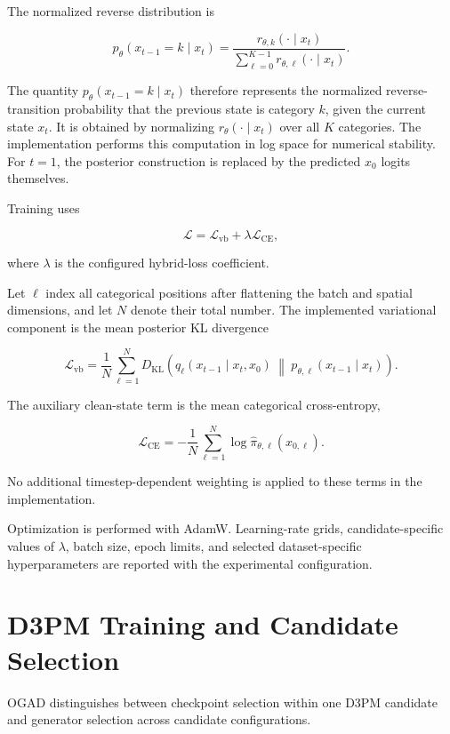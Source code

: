 The normalized reverse distribution is

\[
p_\theta
\left(
x_{t-1}=k
\mid
x_t
\right)
=
\frac{
r_{\theta,k}(\cdot\mid x_t)
}{
\sum_{\ell=0}^{K-1}
r_{\theta,\ell}(\cdot\mid x_t)
}.
\]

The quantity \(p_\theta(x_{t-1}=k\mid x_t)\) therefore represents the normalized reverse-transition probability that the previous state is category \(k\), given the current state \(x_t\). It is obtained by normalizing \(r_\theta(\cdot\mid x_t)\) over all \(K\) categories.
The implementation performs this computation in log space for numerical stability. For \(t=1\), the posterior construction is replaced by the predicted \(x_0\) logits themselves.

Training uses

\[
\mathcal{L}
=
\mathcal{L}_{\mathrm{vb}}
+
\lambda
\mathcal{L}_{\mathrm{CE}},
\]

where \(\lambda\) is the configured hybrid-loss coefficient.

Let \(\ell\) index all categorical positions after flattening the batch and spatial dimensions, and let \(N\) denote their total number. The implemented variational component is the mean posterior KL divergence

\[
\mathcal{L}_{\mathrm{vb}}
=
\frac{1}{N}
\sum_{\ell=1}^{N}
D_{\mathrm{KL}}
\left(
q_\ell
\left(
x_{t-1}
\mid
x_t,x_0
\right)
\;\middle\Vert\;
p_{\theta,\ell}
\left(
x_{t-1}
\mid
x_t
\right)
\right).
\]

The auxiliary clean-state term is the mean categorical cross-entropy,

\[
\mathcal{L}_{\mathrm{CE}}
=
-\frac{1}{N}
\sum_{\ell=1}^{N}
\log
\widehat{\pi}_{\theta,\ell}
\left(
x_{0,\ell}
\right).
\]

No additional timestep-dependent weighting is applied to these terms in the implementation.

Optimization is performed with AdamW. Learning-rate grids, candidate-specific values of \(\lambda\), batch size, epoch limits, and selected dataset-specific hyperparameters are reported with the experimental configuration.


\section{D3PM Training and Candidate Selection}
\label{sec:method_d3pm_selection}

OGAD distinguishes between checkpoint selection within one D3PM candidate and generator selection across candidate configurations.

